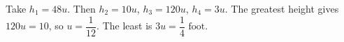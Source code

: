 Take $h_1=48u$. Then $h_2=10u$, $h_3=120u$, $h_4=3u$. The greatest height gives $120u=10$, so $u=\dfrac{1}{12}$. The least is $3u=\boxed{\dfrac{1}{4}\text{ foot}}$.
